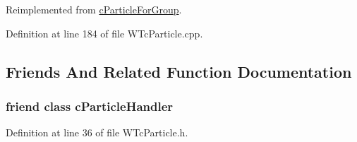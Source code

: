 Reimplemented from \hyperlink{classc_particle_for_group_a9862ab616c1588422e55ecf4ef66df23}{cParticleForGroup}.



Definition at line 184 of file WTcParticle.cpp.



\subsection{Friends And Related Function Documentation}
\hypertarget{classc_gravity_particle_ad810bc5f0330a0154ffaabe8d256379c}{
\subsubsection[{cParticleHandler}]{\setlength{\rightskip}{0pt plus 5cm}friend class {\bf cParticleHandler}}}
\label{classc_gravity_particle_ad810bc5f0330a0154ffaabe8d256379c}


Definition at line 36 of file WTcParticle.h.

